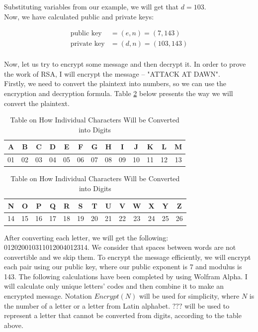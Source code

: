 \documentclass[a4paper, 12pt]{article}
\begin{document}
Substituting variables from our example, we will get that $d=103$.\\

Now, we have calculated public and private keys:

\begin{align*}
  \text{public key}&=(e,n)=(7,143)\\
  \text{private key}&=(d,n)=(103,143)\\
  \end{align*}

Now, let us try to encrypt some message and then decrypt it. In order to prove the work of RSA, I
will encrypt the message – "ATTACK AT DAWN".\\

Firstly, we need to convert the plaintext into numbers, so we can use the encryption and decryption
formula. Table \ref{table:simple} below presents the way we will convert the plaintext.

\begin{table}[t!]
  \begin{center}
    \begin{tabular}{c|c|c|c|c|c|c|c|c|c|c|c|c}
      A& B& C& D& E& F& G& H& I& J& K& L& M\\
      \hline
      01& 02& 03& 04& 05& 06& 07& 08& 09& 10& 11& 12& 13\\
    \end{tabular}
    \begin{tabular}{c|c|c|c|c|c|c|c|c|c|c|c|c}
      N& O& P& Q& R& S& T& U& V& W& X& Y& Z\\
      \hline
      14& 15& 16& 17& 18& 19& 20& 21& 22& 23& 24& 25& 26\\
    \end{tabular}
    \caption{Table on How Individual Characters Will be Converted into Digits}
    \label{table:simple}
  \end{center}
  \end{table}

After converting each letter, we will get the following: 012020010311012004012314. We
consider that spaces between words are not convertible and we skip them. To encrypt the message
efficiently, we will encrypt each pair using our public key, where our public exponent is 7 and
modulus is 143. The following calculations have been completed by using Wolfram Alpha. I will
calculate only unique letters’ codes and then combine it to make an encrypted message. Notation
$Encrypt(N)$ will be used for simplicity, where $N$ is the number of a letter or a letter from Latin alphabet.
$???$ will be used to represent a letter that cannot be converted from digits, according to the table above.
\end{document}
